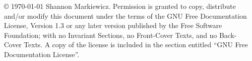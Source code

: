 \copyright \hspace{0.01cm} \mydate\today \hspace{0.01cm}  Shannon Markiewicz.
    Permission is granted to copy, distribute and/or modify this document
    under the terms of the GNU Free Documentation License, Version 1.3
    or any later version published by the Free Software Foundation;
    with no Invariant Sections, no Front-Cover Texts, and no Back-Cover Texts.
    A copy of the license is included in the section entitled ``GNU
    Free Documentation License''.
